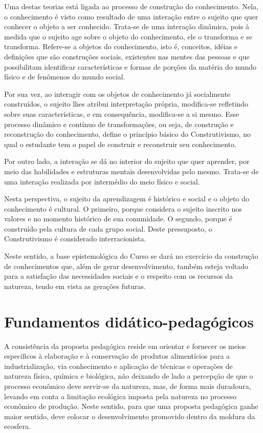 \documentclass[
	12pt,				%
	openright,			%
  oneside,     %
	a4paper,			%
	english,			%
	french,				%
	spanish,			%
	brazil				%
	]{abntex2}
\begin{document}
Uma destas teorias está ligada ao processo de construção do conhecimento. Nela,
o conhecimento é visto como resultado de uma interação entre o sujeito que quer
conhecer o objeto a ser conhecido. Trata-se de uma interação dinâmica, pois à
medida que o sujeito age sobre o objeto do conhecimento, ele o transforma e se
transforma. Refere-se a objetos do conhecimento, isto é, conceitos, idéias e
definições que são construções sociais, existentes nas mentes das pessoas e que
possibilitam identificar características e formas de porções da matéria do mundo
físico e de fenômenos do mundo social.

Por sua vez, ao interagir com os objetos de conhecimento já socialmente
construídos, o sujeito lhes atribui interpretação própria, modifica-se
refletindo sobre suas características, e em consequência, modifica-se a si
mesmo. Esse processo dinâmico e contínuo de transformações, ou seja, de
construção e reconstrução do conhecimento, define o princípio básico do
Construtivismo, no qual o estudante tem o papel de construir e reconstruir seu
conhecimento.

Por outro lado, a interação se dá no interior do sujeito que quer aprender, por
meio das habilidades e estruturas mentais desenvolvidas pelo mesmo. Trata-se de
uma interação realizada por intermédio do meio físico e social.

Nesta perspectiva, o sujeito da aprendizagem é histórico e social e o objeto do
conhecimento é cultural. O primeiro, porque considera o sujeito inscrito nos
valores e no momento histórico de sua comunidade. O segundo, porque é construído
pela cultura de cada grupo social. Deste pressuposto, o Construtivismo é
considerado interracionista.

Neste sentido, a base epistemológica do Curso se dará no exercício da construção
de conhecimentos que, além de gerar desenvolvimento, também esteja voltado para
a satisfação das necessidades sociais e o respeito com os recursos da natureza,
tendo em vista as gerações futuras.

\section{Fundamentos didático-pedagógicos}

A consistência da proposta pedagógica reside em orientar e fornecer os meios
específicos à elaboração e à conservação de produtos alimentícios para a
industrialização, via conhecimento e aplicação de técnicas e operações de
natureza física, química e biológica, não deixando de lado a percepção de que o
processo econômico deve servir-se da natureza, mas, de forma mais duradoura,
levando em conta a limitação ecológica imposta pela natureza no processo
econômico de produção. Neste sentido, para que uma proposta pedagógica ganhe
maior sentido, deve colocar o desenvolvimento promovido dentro da moldura da
ecosfera.
\end{document}
